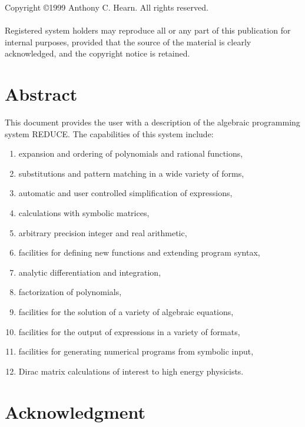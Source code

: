 \documentclass[11pt,letterpaper]{book}
\newcommand{\REDUCE}{REDUCE}
\begin{document}
\newpage
\vspace*{3.0in}
\noindent Copyright \copyright 1999 Anthony C. Hearn.  All rights reserved. \\
\mbox{}\\
%
\noindent Registered system holders may reproduce all or any part of this
publication for internal purposes, provided that the source of the
material is clearly acknowledged, and the copyright notice is retained.

\pagestyle{headings}

\chapter*{Abstract}


This document provides the user with a description of the algebraic
programming system {\REDUCE}.  The capabilities of this system include:
\begin{enumerate}
\item expansion and ordering of polynomials and rational functions,
\item substitutions and pattern matching in a wide variety of forms,
\item automatic and user controlled simplification of expressions,
\item calculations with symbolic matrices,
\item arbitrary precision integer and real arithmetic,
\item facilities for defining new functions and extending program syntax,
\item analytic differentiation and integration,
\item factorization of polynomials,
\item facilities for the solution of a variety of algebraic equations,
\item facilities for the output of expressions in a variety of formats,
\item facilities for generating numerical programs from symbolic input,
\item Dirac matrix calculations of interest to high energy physicists.
\end{enumerate}

\chapter*{Acknowledgment}
\end{document}
